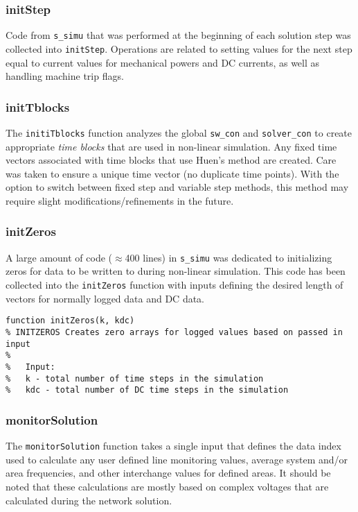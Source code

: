 \subsubsection{initStep}  
Code from \verb|s_simu| that was performed at the beginning of each solution step was collected into \verb|initStep|.
Operations are related to setting values for the next step equal to current values for mechanical powers and DC currents, as well as handling machine trip flags.

\subsubsection{initTblocks}  
The \verb|initiTblocks| function analyzes the global \verb|sw_con| and \verb|solver_con| to create appropriate \emph{time blocks} that are used in non-linear simulation.
Any fixed time vectors associated with time blocks that use Huen's method are created.
Care was taken to ensure a unique time vector (no duplicate time points).
With the option to switch between fixed step and variable step  methods, this method may require slight modifications/refinements in the future.

\subsubsection{initZeros}  
A large amount of code ($\approx$400 lines) in \verb|s_simu| was dedicated to initializing zeros for data to be written to during non-linear simulation.
This code has been collected into the \verb|initZeros| function with inputs defining the desired length of vectors for normally logged data and DC data.

\begin{verbatim}
function initZeros(k, kdc)
% INITZEROS Creates zero arrays for logged values based on passed in input
%
%   Input:
%   k - total number of time steps in the simulation
%   kdc - total number of DC time steps in the simulation
\end{verbatim}


\subsubsection{monitorSolution}  
The \verb|monitorSolution| function takes a single input that defines the data index used to calculate any user defined line monitoring values, average system and/or area frequencies, and other interchange values for defined areas.
It should be noted that these calculations are mostly based on complex voltages that are calculated during the network solution.


